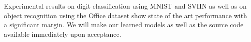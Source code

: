 \documentclass{article}
\begin{document}
Experimental results on digit classification using MNIST\cite{mnist} and SVHN\cite{svhn} as well as on object recognition using the Office\cite{office} dataset show state of the art performance with a significant margin. We will make our learned models as well as the source code available immediately upon acceptance.


\clearpage
\setlength{\bibsep}{2pt plus 0.25ex}
\begin{spacing}{0.95}
{\small


}
\end{spacing}
\end{document}
